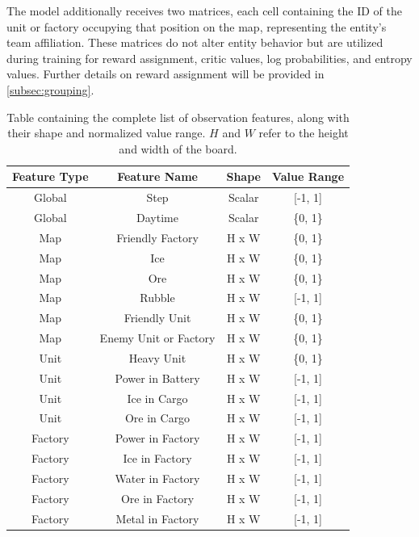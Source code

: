 \bigskip

\noindent The model additionally receives two matrices, each cell containing the ID of the unit or factory occupying that position on the map, representing the entity's team affiliation. These matrices do not alter entity behavior but are utilized during training for reward assignment, critic values, log probabilities, and entropy values. Further details on reward assignment will be provided in \autoref{subsec:grouping}.

\begin{table}[htbp]
    \centering
    \begin{tabular}{|c|c|c|c|}
        \hline
        \textbf{Feature Type} & \textbf{Feature Name} & \textbf{Shape} & \textbf{Value Range} \\
        \hline
        Global & Step & Scalar & [-1, 1] \\
        Global & Daytime & Scalar & \{0, 1\} \\
        \hline
        Map & Friendly Factory & H x W & \{0, 1\} \\
        Map & Ice & H x W & \{0, 1\} \\
        Map & Ore & H x W & \{0, 1\} \\
        Map & Rubble & H x W & [-1, 1] \\
        Map & Friendly Unit & H x W & \{0, 1\} \\
        Map & Enemy Unit or Factory & H x W & \{0, 1\} \\
        \hline
        Unit & Heavy Unit & H x W & \{0, 1\} \\
        Unit & Power in Battery & H x W & [-1, 1] \\
        Unit & Ice in Cargo & H x W & [-1, 1] \\
        Unit & Ore in Cargo & H x W & [-1, 1] \\
        \hline
        Factory & Power in Factory & H x W & [-1, 1] \\
        Factory & Ice in Factory & H x W & [-1, 1] \\
        Factory & Water in Factory & H x W & [-1, 1] \\
        Factory & Ore in Factory & H x W & [-1, 1] \\
        Factory & Metal in Factory & H x W & [-1, 1] \\
        \hline
    \end{tabular}
    \captionsetup{justification=justified, singlelinecheck=false, width=1\linewidth, labelfont=bf}
    \caption{Table containing the complete list of observation features, along with their shape and normalized value range. $H$ and $W$ refer to the height and width of the board.}
    \label{tab:features}
\end{table}

